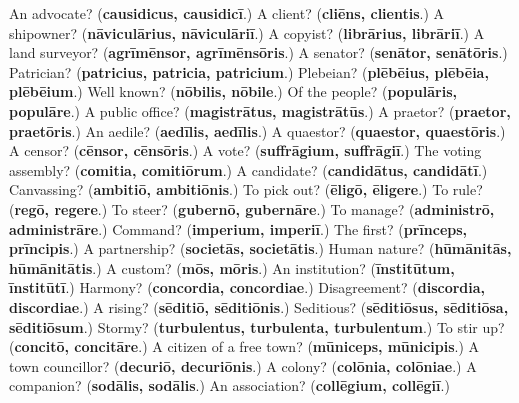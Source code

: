 \begin{tcolorbox}[breakable,colback=teal!4,colframe=teal!35!black,title={Before you move on}]
An advocate? (\textbf{causidicus, causidicī}.) A client? (\textbf{cliēns, clientis}.) A shipowner? (\textbf{nāviculārius, nāviculāriī}.) A copyist? (\textbf{librārius, librāriī}.) A land surveyor? (\textbf{agrīmēnsor, agrīmēnsōris}.) A senator? (\textbf{senātor, senātōris}.) Patrician? (\textbf{patricius, patricia, patricium}.) Plebeian? (\textbf{plēbēius, plēbēia, plēbēium}.) Well known? (\textbf{nōbilis, nōbile}.) Of the people? (\textbf{populāris, populāre}.) A public office? (\textbf{magistrātus, magistrātūs}.) A praetor? (\textbf{praetor, praetōris}.) An aedile? (\textbf{aedīlis, aedīlis}.) A quaestor? (\textbf{quaestor, quaestōris}.) A censor? (\textbf{cēnsor, cēnsōris}.) A vote? (\textbf{suffrāgium, suffrāgiī}.) The voting assembly? (\textbf{comitia, comitiōrum}.) A candidate? (\textbf{candidātus, candidātī}.) Canvassing? (\textbf{ambitiō, ambitiōnis}.) To pick out? (\textbf{ēligō, ēligere}.) To rule? (\textbf{regō, regere}.) To steer? (\textbf{gubernō, gubernāre}.) To manage? (\textbf{administrō, administrāre}.) Command? (\textbf{imperium, imperiī}.) The first? (\textbf{prīnceps, prīncipis}.) A partnership? (\textbf{societās, societātis}.) Human nature? (\textbf{hūmānitās, hūmānitātis}.) A custom? (\textbf{mōs, mōris}.) An institution? (\textbf{īnstitūtum, īnstitūtī}.) Harmony? (\textbf{concordia, concordiae}.) Disagreement? (\textbf{discordia, discordiae}.) A rising? (\textbf{sēditiō, sēditiōnis}.) Seditious? (\textbf{sēditiōsus, sēditiōsa, sēditiōsum}.) Stormy? (\textbf{turbulentus, turbulenta, turbulentum}.) To stir up? (\textbf{concitō, concitāre}.) A citizen of a free town? (\textbf{mūniceps, mūnicipis}.) A town councillor? (\textbf{decuriō, decuriōnis}.) A colony? (\textbf{colōnia, colōniae}.) A companion? (\textbf{sodālis, sodālis}.) An association? (\textbf{collēgium, collēgiī}.)
\end{tcolorbox}
